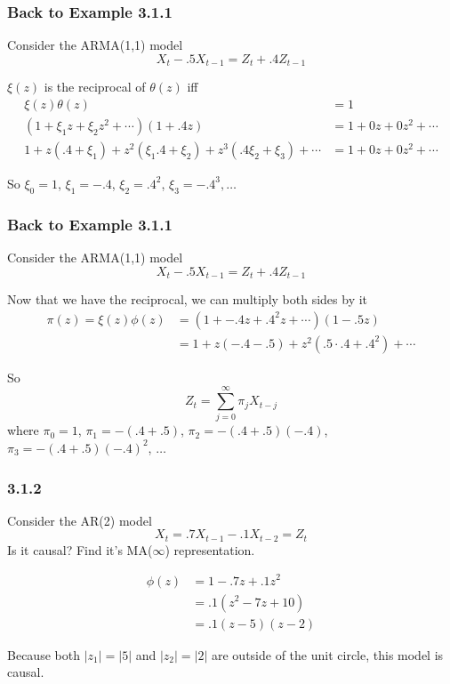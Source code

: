 \documentclass{beamer}
\begin{document}

\begin{frame}
\frametitle{Back to Example 3.1.1}
Consider the ARMA(1,1) model 
\[
X_t - .5 X_{t-1} = Z_t + .4 Z_{t-1}
\]

$\xi(z)$ is the reciprocal of $\theta(z)$ iff
\begin{align*}
\xi(z)\theta(z) &= 1  \\
(1 + \xi_1 z + \xi_2 z^2 + \cdots)(1 + .4 z) &= 1  + 0z + 0z^2 + \cdots\\
1 + z(.4 + \xi_1) + z^2 ( \xi_1 .4 + \xi_2) + z^3(.4 \xi_2 + \xi_3) + \cdots &= 1+ 0z + 0z^2 + \cdots
\end{align*}

So $\xi_0 = 1$, $\xi_1 = - .4$, $\xi_2 = .4^2$, $\xi_3 = -.4^3, \ldots$
\end{frame}

\begin{frame}
\frametitle{Back to Example 3.1.1}
Consider the ARMA(1,1) model 
\[
X_t - .5 X_{t-1} = Z_t + .4 Z_{t-1}
\]

Now that we have the reciprocal, we can multiply both sides by it
\begin{align*}
\pi(z) = \xi(z)\phi(z) &= (1 + -.4z + .4^2 z + \cdots)(1 - .5z) \\
&= 1 + z(-.4 - .5) + z^2(.5\cdot.4+.4^2) + \cdots
\end{align*}

So 
\[
Z_t = \sum_{j=0}^{\infty}\pi_j X_{t-j} 
\]
where $\pi_0 = 1$, $\pi_1 = -(.4 + .5)$, $\pi_2 = -(.4 + .5)(-.4)$, $\pi_3 = -(.4 + .5)(-.4)^2$, $\ldots$
\end{frame}


\begin{frame}
\frametitle{3.1.2}
Consider the AR(2) model 
\[
X_t = .7 X_{t-1} - .1X_{t-2} = Z_t 
\]
Is it causal? Find it's MA($\infty$) representation.
\pause

\begin{align*}
\phi(z) &= 1 - .7z + .1 z^2 \\
&= .1(z^2 - 7z + 10) \\
&= .1(z - 5)(z-2)
\end{align*}

Because both $|z_1| = |5|$ and $|z_2| = |2|$ are outside of the unit circle, this model is causal. 

\end{frame}
\end{document}
